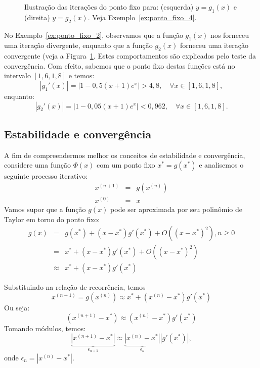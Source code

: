 \begin{figure}[h]
    \caption{Ilustração das iterações do ponto fixo para: (esquerda) $y = g_1(x)$ e (direita) $y = g_2(x)$. Veja Exemplo~\ref{ex:ponto_fixo_4}.} \label{fig:teste_de_convergencia}
\end{figure}

\begin{ex}\label{ex:ponto_fixo_4}
  No Exemplo~\ref{ex:ponto_fixo_2}, observamos que a função $g_1(x)$ nos forneceu uma iteração divergente, enquanto que a função $g_2(x)$ forneceu uma iteração convergente (veja a Figura~\ref{fig:teste_de_convergencia}. Estes comportamentos são explicados pelo teste da convergência. Com efeito, sabemos que o ponto fixo destas funções está no intervalo $[1,6, 1,8]$ e temos:
  \begin{equation}
    |g_1'(x)| = |1 - 0,5(x+1)e^x| > 4,8,\quad\forall x\in [1,6, 1,8],
  \end{equation}
enquanto:
\begin{equation}
  |g_2'(x)| = |1 - 0,05(x+1)e^x| < 0,962,\quad\forall x\in [1,6, 1,8].
\end{equation}
\end{ex}

\subsection{Estabilidade e convergência}

A fim de compreendermos melhor os conceitos de estabilidade e convergência, considere uma função $\Phi(x)$ com um ponto fixo $x^*=g(x^*)$ e analisemos o seguinte processo iterativo:
\begin{eqnarray}
x^{(n+1)}&=&g\left(x^{(n)}\right)\\
x^{(0)}&=&x
\end{eqnarray}
Vamos supor que a função $g(x)$ pode ser aproximada por seu polinômio de Taylor em torno do ponto fixo:
\begin{eqnarray}
g(x)&=&g(x^*)+(x-x^*) g'(x^*)+O\left((x-x^*)^2\right), n\geq 0\\
&=&x^*+(x-x^*) g'(x^*)+O\left((x-x^*)^2\right)\\
&\approx& x^*+(x-x^*) g'(x^*)
\end{eqnarray}

Substituindo na relação de recorrência, temos
\begin{equation}
x^{(n+1)}=g\left(x^{(n)}\right)\approx x^*+(x^{(n)}-x^*) g'(x^*)
\end{equation}
Ou seja:
\begin{equation}
\left(x^{(n+1)}-x^*\right)\approx {(x^{(n)}-x^*)} g'(x^*)
\end{equation}
Tomando módulos, temos:
\begin{equation}
\underbrace{\left|x^{(n+1)}-x^*\right|}_{\epsilon_{n+1}}\approx \underbrace{\left|x^{(n)}-x^*\right|}_{\epsilon_n} \left|g'(x^*)\right|,
\end{equation}
onde $\epsilon_n=\left|x^{(n)}-x^*\right|$.

